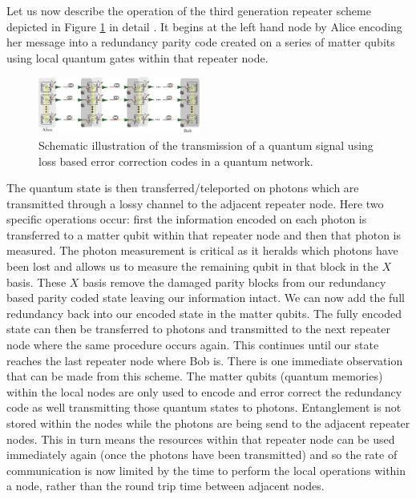 \documentclass[twocolumn, aps, rmp, amsmath, amssymb, nofootinbib, superscriptaddress, longbibliography, floatfix, table-of-contents, eqsecnum]{revtex4-1}
\begin{document}
Let us now describe the operation of the third generation repeater scheme  depicted in Figure \ref{fig9} in detail \cite{munro12,MKLLJ14}. It begins at the left hand node by Alice encoding her message into a redundancy parity code created on a series of matter qubits  using local quantum gates within that repeater node. 
\begin{figure}[!htb]
\begin{center}
\includegraphics[width=0.475\textwidth]{repeaters_9}
\end{center}
\caption{Schematic illustration of the transmission of a quantum signal using loss based error correction codes in a quantum network. }
\label{fig9}
\end{figure} The quantum state is then transferred/teleported on photons which are transmitted through a lossy channel to the adjacent repeater node. Here two specific operations occur: first the information encoded on each photon is transferred to a matter qubit within that repeater node and then that photon is measured. The photon measurement is critical as it heralds which photons have been lost and allows us to measure the remaining qubit in that block in the $X$ basis. These  $X$ basis remove the damaged parity blocks from our redundancy based parity coded state leaving our information intact. We can now add the full redundancy back into our encoded state in the matter qubits.  The fully encoded state can then be transferred to photons and transmitted to the next repeater node where the same procedure occurs again. This continues until our state reaches the last repeater node where Bob is. There is one immediate observation that can be made from this scheme. The matter qubits (quantum memories) within the local nodes are only used to encode and error correct the redundancy code as well transmitting those quantum states to photons. Entanglement is not stored within the nodes while the photons are being send to the adjacent repeater nodes. This in turn means the resources within that repeater node can be used immediately again (once the photons have been transmitted) and so the rate of communication is now limited by the time to perform the local operations within a node, rather than the round trip time between adjacent nodes. 
\end{document}
